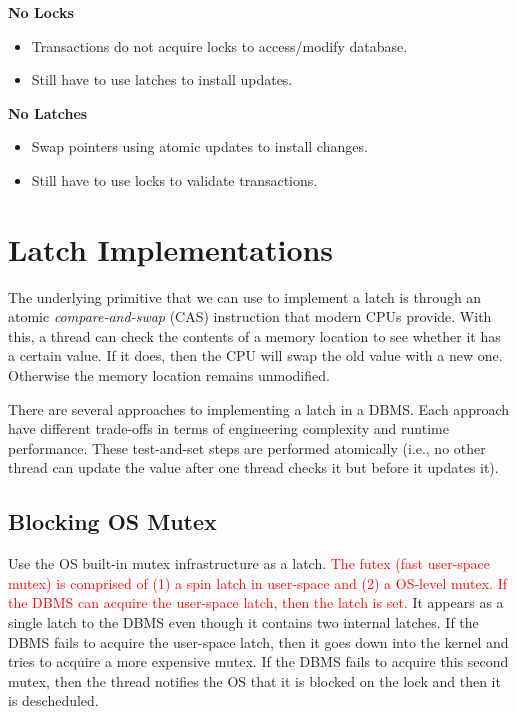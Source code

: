 \documentclass[11pt]{article}
\newcommand{\rr}[1]{\textcolor{red}{#1}}
\begin{document}
\textbf{No Locks}
\begin{itemize}
    \item Transactions do not acquire locks to access/modify database.
    \item Still have to use latches to install updates.
\end{itemize}

\textbf{No Latches}
\begin{itemize}
    \item Swap pointers using atomic updates to install changes.
    \item Still have to use locks to validate transactions.
\end{itemize}

\section{Latch Implementations}
The underlying primitive that we can use to implement a latch is through an atomic \textit{compare-and-swap} (CAS) instruction that modern CPUs provide. With this, a thread can check the contents of a memory location to see whether it has a certain value. If it does, then the CPU will swap the old value with a new one. Otherwise the memory location remains unmodified.

There are several approaches to implementing a latch in a DBMS. Each approach have different trade-offs in terms of engineering complexity and runtime performance. These test-and-set steps are performed atomically (i.e., no other thread can update the value after one thread checks it but before it updates it). 

\subsection*{Blocking OS Mutex}
Use the OS built-in mutex infrastructure as a latch. \rr{The futex (fast user-space mutex) is comprised of (1) a spin latch in user-space and (2) a OS-level mutex. If the DBMS can acquire the user-space latch, then the latch is set.} It appears as a single latch to the DBMS even though it contains two internal latches. If the DBMS fails to acquire the user-space latch, then it goes down into the kernel and tries to acquire a more expensive mutex. If the DBMS fails to acquire this second mutex, then the thread notifies the OS that it is blocked on the lock and then it is descheduled.
\end{document}
